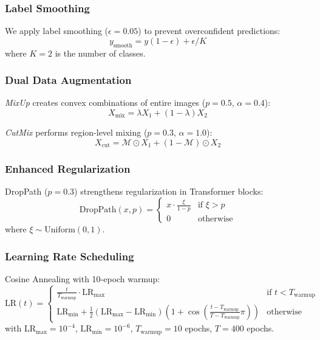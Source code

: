 \documentclass[journal]{IEEEtran}
\begin{document}
\subsubsection{Label Smoothing}

We apply label smoothing ($\epsilon=0.05$) to prevent overconfident predictions:
\begin{equation}
y_{\text{smooth}} = y(1-\epsilon) + \epsilon / K
\end{equation}
where $K=2$ is the number of classes.

\subsubsection{Dual Data Augmentation}

\textit{MixUp} creates convex combinations of entire images ($p=0.5$, $\alpha=0.4$):
\begin{equation}
X_{\text{mix}} = \lambda X_1 + (1-\lambda) X_2
\end{equation}

\textit{CutMix} performs region-level mixing ($p=0.3$, $\alpha=1.0$):
\begin{equation}
X_{\text{cut}} = \mathcal{M} \odot X_1 + (1-\mathcal{M}) \odot X_2
\end{equation}

\subsubsection{Enhanced Regularization}

DropPath ($p=0.3$) strengthens regularization in Transformer blocks:
\begin{equation}
\text{DropPath}(x, p) = \begin{cases}
x \cdot \frac{\xi}{1-p} & \text{if } \xi > p \\
0 & \text{otherwise}
\end{cases}
\end{equation}
where $\xi \sim \text{Uniform}(0,1)$.

\subsubsection{Learning Rate Scheduling}

Cosine Annealing with 10-epoch warmup:
\begin{equation}
\text{LR}(t) = \begin{cases}
\frac{t}{T_{\text{warmup}}} \cdot \text{LR}_{\text{max}} & \text{if } t < T_{\text{warmup}} \\
\text{LR}_{\text{min}} + \frac{1}{2}(\text{LR}_{\text{max}} - \text{LR}_{\text{min}})\left(1 + \cos\left(\frac{t-T_{\text{warmup}}}{T-T_{\text{warmup}}}\pi\right)\right) & \text{otherwise}
\end{cases}
\end{equation}
with $\text{LR}_{\text{max}}=10^{-4}$, $\text{LR}_{\text{min}}=10^{-6}$, $T_{\text{warmup}}=10$ epochs, $T=400$ epochs.
\end{document}
